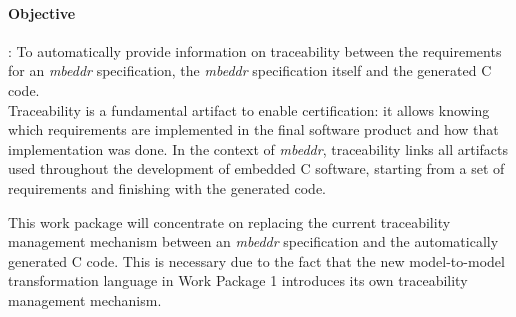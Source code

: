 \paragraph{\textbf{Objective}}: To automatically provide information on
traceability between the requirements for an \emph{mbeddr} specification, the \emph{mbeddr}
specification itself and the generated C code.\vspace{.2cm}\\
Traceability is a fundamental artifact to enable certification: it allows
knowing which requirements are implemented in the final software product and how
that implementation was done. In the context of \emph{mbeddr}, traceability links all
artifacts used throughout the development of embedded C software, starting from
a set of requirements and finishing with the generated code. 

This work package will concentrate on replacing the current traceability
management mechanism between an \emph{mbeddr} specification and the
automatically generated C code. This is necessary due to
the fact that the new model-to-model transformation language in Work Package 1
introduces its own traceability management mechanism.


